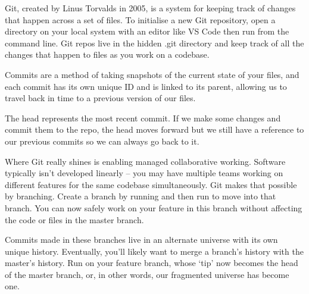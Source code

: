 Git, created by Linus Torvalds in 2005, is a system for keeping track of changes that happen across a set of files. To initialise a new Git repository, open a directory on your local system with an editor like VS Code then run  from the command line. Git repos live in the hidden .git directory and keep track of all the changes that happen to files as you work on a codebase.

Commits are a method of taking snapshots of the current state of your files, and each commit has its own unique ID and is linked to its parent, allowing us to travel back in time to a previous version of our files.

The head represents the most recent commit. If we make some changes and commit them to the repo, the head moves forward but we still have a reference to our previous commits so we can always go back to it.

Where Git really shines is enabling managed collaborative working. Software typically isn't developed linearly -- you may have multiple teams working on different features for the same codebase simultaneously. Git makes that possible by branching. Create a branch by running  and then run  to move into that branch. You can now safely work on your feature in this branch without affecting the code or files in the master branch.

Commits made in these branches live in an alternate universe with its own unique history. Eventually, you'll likely want to merge a branch's history with the master's history. Run  on your feature branch, whose `tip' now becomes the head of the master branch, or, in other words, our fragmented universe has become one.